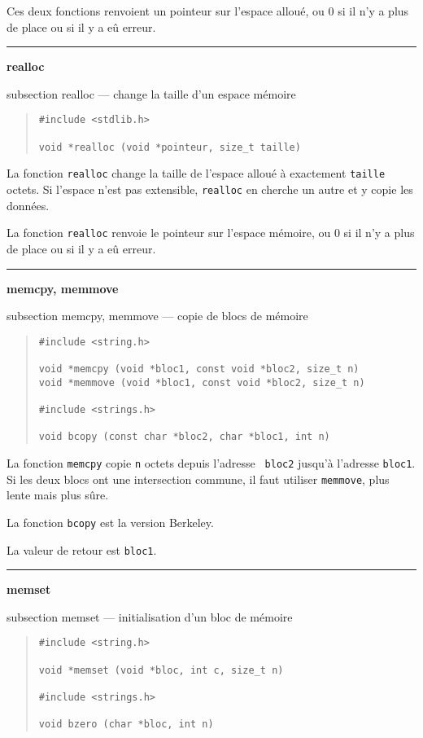 \documentclass [twoside] {report}
\newcommand {\primitive} [1]
    {
	{\large \bf #1}
	\addcontentsline {toc} {subsection} {#1}
    }
\newcommand {\separation}
    {
	\vspace {7mm}
	\nopagebreak
	\hrule
    }
\begin{document}
Ces deux fonctions renvoient un pointeur sur l'espace
alloué, ou 0 si il n'y a plus de place ou si il y a eû
erreur.


\separation
\primitive {realloc} --- change la taille d'un espace mémoire

\begin {quote}
\begin {verbatim}
#include <stdlib.h>

void *realloc (void *pointeur, size_t taille)
\end{verbatim}
\end {quote}

La fonction {\tt realloc} change la taille de l'espace alloué
à exactement {\tt taille} octets. Si l'espace n'est pas
extensible, {\tt realloc} en cherche un autre et y copie les
données.

La fonction {\tt realloc} renvoie le pointeur sur l'espace
mémoire, ou 0 si il n'y a plus de place ou si il y a eû
erreur.





\separation
\primitive {memcpy, memmove} --- copie de blocs de mémoire

\begin {quote}
\begin {verbatim}
#include <string.h>

void *memcpy (void *bloc1, const void *bloc2, size_t n)
void *memmove (void *bloc1, const void *bloc2, size_t n)

#include <strings.h>

void bcopy (const char *bloc2, char *bloc1, int n)
\end{verbatim}
\end {quote}

La fonction {\tt memcpy} copie {\tt n} octets depuis l'adresse {\tt
bloc2} jusqu'à l'adresse {\tt bloc1}. Si les deux blocs ont une
intersection commune, il faut utiliser {\tt memmove}, plus lente mais
plus sûre.

La fonction {\tt bcopy} est la version Berkeley.

La valeur de retour est {\tt bloc1}.


\separation
\primitive {memset} --- initialisation d'un bloc de mémoire

\begin {quote}
\begin {verbatim}
#include <string.h>

void *memset (void *bloc, int c, size_t n)

#include <strings.h>

void bzero (char *bloc, int n)
\end{verbatim}
\end {quote}
\end{document}
